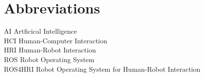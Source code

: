 
\chapter*{Abbreviations}

\begin{flushleft}

AI \hfill  Artficical Intelligence \\

HCI \hfill  Human-Computer Interaction \\

HRI \hfill  Human-Robot Interaction \\

ROS \hfill  Robot Operating System \\

ROS4HRI \hfill  Robot Operating System for Human-Robot Interaction \\


\end{flushleft}